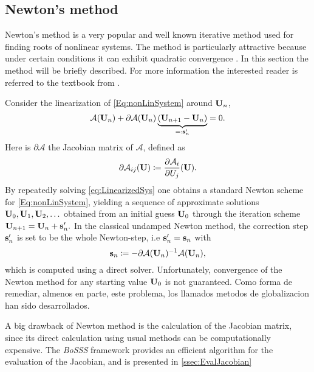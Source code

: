 \subsection{Newton's method}
Newton's method is a very popular and well known iterative method used for finding roots of nonlinear systems. The method is particularly attractive because under certain conditions it can exhibit quadratic convergence \parencite{deuflhardNewtonMethodsNonlinear2011}. In this section the method will be briefly described. For more information the interested reader is referred to the textbook from \textcite{kelleyIterativeMethodsLinear1995}. 

Consider the linearization of \cref{Eq:nonLinSystem} around $\textbf{U}_n$,
\begin{equation}
	\mathcal{A}(\textbf{U}_{n}) +
	\partial \mathcal{A} (\textbf{U}_n) \underbrace{ ( \textbf{U}_{n+1} -  \textbf{U}_{n} ) }_{=: \textbf{s}'_n }
	= 0.
	\label{eq:LinearizedSys}
\end{equation}
Here is $\partial \mathcal{A}$ the Jacobian matrix of $\mathcal{A}$, defined as
\begin{equation}
	\partial \mathcal{A}_{ij}(\textbf{U}) \coloneqq \frac{\partial \mathcal{A}_i}{\partial U_j}(\textbf{U}).
	\label{Eq:Jacobian}
\end{equation}
By repeatedly solving \cref{eq:LinearizedSys} one obtains a standard Newton scheme for \cref{Eq:nonLinSystem}, yielding a sequence of approximate solutions $\textbf{U}_0, \textbf{U}_1, \textbf{U}_2, \ldots$ obtained from an initial guess $\textbf{U}_0$ through the iteration scheme $ \textbf{U}_{n+1} =\textbf{U}_n + \textbf{s}'_n.$
In the classical undamped Newton method, the correction step $\textbf{s}'_n$ is set to be the whole Newton-step, i.e  $\textbf{s}'_n = \textbf{s}_n$ with
\begin{equation}
	\textbf{s}_n  \coloneqq - \partial \mathcal{A}(\textbf{U}_n)^{-1}\mathcal{A}(\textbf{U}_n),
	\label{eq:NewtonStep}
\end{equation}
which is computed using a direct solver.
Unfortunately, convergence of the Newton method for any starting value $\textbf{U}_0$ is not guaranteed. Como forma de remediar, almenos en parte, este problema, los llamados metodos de globalizacion han sido desarrollados. 

A big drawback of Newton method is the calculation of the Jacobian matrix, since its direct calculation using usual methods can be computationally expensive. The \textit{BoSSS} framework provides an efficient algorithm for the evaluation of the Jacobian, and is presented in \cref{ssec:EvalJacobian}


